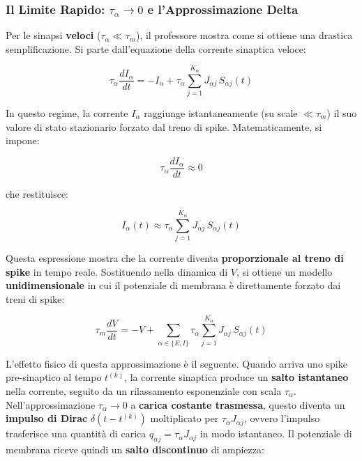 \subsubsection{Il Limite Rapido: $\tau_\alpha \to 0$ e l'Approssimazione Delta}

Per le sinapsi \textbf{veloci} ($\tau_\alpha \ll \tau_m$), il professore mostra come si ottiene una drastica semplificazione. Si parte dall'equazione della corrente sinaptica veloce:

\begin{equation}
\tau_\alpha \frac{dI_\alpha}{dt} = -I_\alpha + \tau_\alpha \sum_{j=1}^{K_\alpha} J_{\alpha j}\, S_{\alpha j}(t)
\end{equation}

In questo regime, la corrente $I_\alpha$ raggiunge istantaneamente (su scale $\ll \tau_m$) il suo valore di stato stazionario forzato dal treno di spike. Matematicamente, si impone:

\begin{equation}
\tau_\alpha \frac{dI_\alpha}{dt} \approx 0
\end{equation}

che restituisce:

\begin{equation}
I_\alpha(t) \approx \tau_\alpha \sum_{j=1}^{K_\alpha} J_{\alpha j}\, S_{\alpha j}(t)
\end{equation}

Questa espressione mostra che la corrente diventa \textbf{proporzionale al treno di spike} in tempo reale. Sostituendo nella dinamica di $V$, si ottiene un modello \textbf{unidimensionale} in cui il potenziale di membrana è direttamente forzato dai treni di spike:

\begin{equation}
\tau_m \frac{dV}{dt} = -V + \sum_{\alpha \in \{E,I\}} \tau_\alpha \sum_{j=1}^{K_\alpha} J_{\alpha j}\, S_{\alpha j}(t)
\end{equation}

L'effetto fisico di questa approssimazione è il seguente. Quando arriva uno spike pre-sinaptico al tempo $t^{(k)}$, la corrente sinaptica produce un \textbf{salto istantaneo} nella corrente, seguito da un rilassamento esponenziale con scala $\tau_\alpha$. Nell'approssimazione $\tau_\alpha \to 0$ a \textbf{carica costante trasmessa}, questo diventa un \textbf{impulso di Dirac} $\delta(t - t^{(k)})$ moltiplicato per $\tau_\alpha J_{\alpha j}$, ovvero l'impulso trasferisce una quantità di carica $q_{\alpha j} = \tau_\alpha J_{\alpha j}$ in modo istantaneo. Il potenziale di membrana riceve quindi un \textbf{salto discontinuo} di ampiezza:

